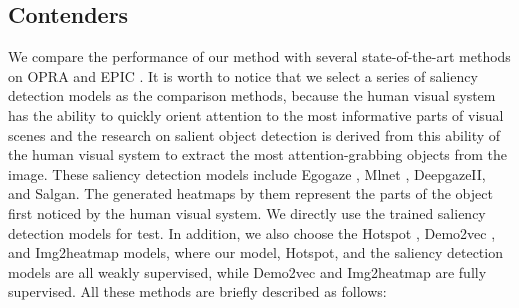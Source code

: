 \documentclass[journal,twoside]{IEEEtran}
\begin{document}
\subsection{Contenders}
We compare the performance of our method with several state-of-the-art methods on OPRA \cite{demo2vec2018cvpr} and EPIC \cite{Damen2018EPICKITCHENS}. It is worth to notice that we select a series of saliency detection models as the comparison methods, because the human visual system has the ability to quickly orient attention to the most informative parts of visual scenes and the research on salient object detection is derived from this ability of the human visual system to extract the most attention-grabbing objects from the image. These saliency detection models include Egogaze \cite{DBLP:conf/eccv/HuangCLS18}, Mlnet \cite{DBLP:conf/icpr/CorniaBSC16}, DeepgazeII\cite{DBLP:journals/corr/KummererWB16}, and Salgan\cite{Pan_2017_SalGAN}. The generated heatmaps by them represent the parts of the object first noticed by the human visual system. We directly use the trained saliency detection models for test. In addition, we also choose the Hotspot \cite{interaction-hotspots}, Demo2vec \cite{demo2vec2018cvpr}, and Img2heatmap \cite{interaction-hotspots} models, where our model, Hotspot, and the saliency detection models are all weakly supervised, while Demo2vec and Img2heatmap are fully supervised. All these methods are briefly described as follows: 
\end{document}
